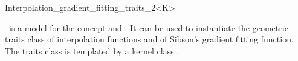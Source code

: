 

\begin{ccRefClass}{Interpolation_gradient_fitting_traits_2<K>}
  
   \ccDefinition \ccRefName\ is a model for
  the concept  and
  . It can be used to instantiate the
  geometric traits class of interpolation functions and of Sibson's
  gradient fitting function. The traits class is templated by a kernel
  class .
  

  \ccIsModel 


  \ccSeeAlso
  
  
\end{ccRefClass}


